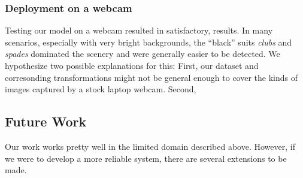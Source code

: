 \documentclass[a4paper]{article}
\begin{document}
\subsubsection*{Deployment on a webcam}
Testing our model on a webcam resulted in satisfactory,  results. In many scenarios, especially with very bright backgrounds, the ``black'' suits \textit{clubs} and \textit{spades} dominated the scenery and were generally easier to be detected. We hypothesize two possible explanations for this: First, our dataset and corresonding transformations might not be general enough to cover the kinds of images captured by a stock laptop webcam. Second,   

\subsection{Future Work}
Our work works pretty well in the limited domain described above. However, if we were to develop a more reliable system, there are several extensions to be made.
\end{document}
